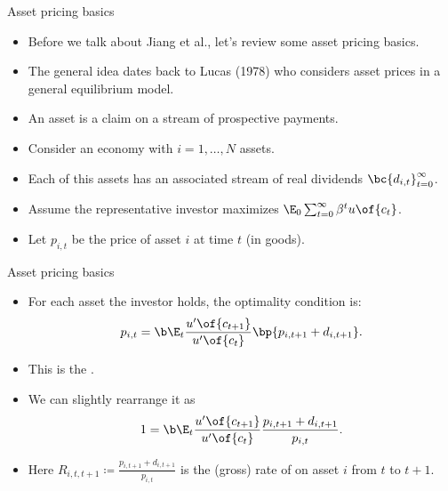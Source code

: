 \documentclass[11pt,xcolor={dvipsnames},aspectratio=159,hyperref={pdftex,pdfpagemode=UseNone,hidelinks,pdfdisplaydoctitle=true},usepdftitle=false]{beamer}
\begin{document}
\begin{frame}{Asset pricing basics}  
    \begin{itemize}
        \item Before we talk about Jiang et al., let's review some asset pricing basics. 
        \item The general idea dates back to Lucas (1978) who considers asset prices in a general equilibrium model.
        \item An asset is a claim on a stream of prospective payments.
        \item Consider an economy with $i=1,\dots,N$ assets.
        \item Each of this assets has an associated stream of real dividends $\bc{d_{i,t}}^\infty_{t=0}$. 
        \item Assume the representative investor maximizes $\E_0 \sum_{t=0}^\infty \beta^t u\of{c_t}$.
        \item Let $p_{i,t}$ be the price of asset $i$ at time $t$ (in goods).
    \end{itemize}
\end{frame}


\begin{frame}{Asset pricing basics}  
    \begin{itemize}
        \item For each asset the investor holds, the optimality condition is: 
\begin{align*}
        p_{i,t}  = \b \E_t \frac{u^\prime\of{c_{t+1}}}{u^\prime\of{c_t}} \bp{ p_{i,t+1} + d_{i,t+1}}.    
\end{align*}
\item This is the .
        \item We can slightly rearrange it as 
        \begin{align*}
            1  = \b \E_t \frac{u^\prime\of{c_{t+1}}}{u^\prime\of{c_t}} \frac{ p_{i,t+1} + d_{i,t+1}}{p_{i,t}}.    
    \end{align*}
    \item Here $R_{i,t,t+1}\coloneq \frac{ p_{i,t+1} + d_{i,t+1}}{p_{i,t}}$ is the (gross) rate of  on asset $i$ from $t$ to $t+1$.
    \end{itemize}
\end{frame}
\end{document}

